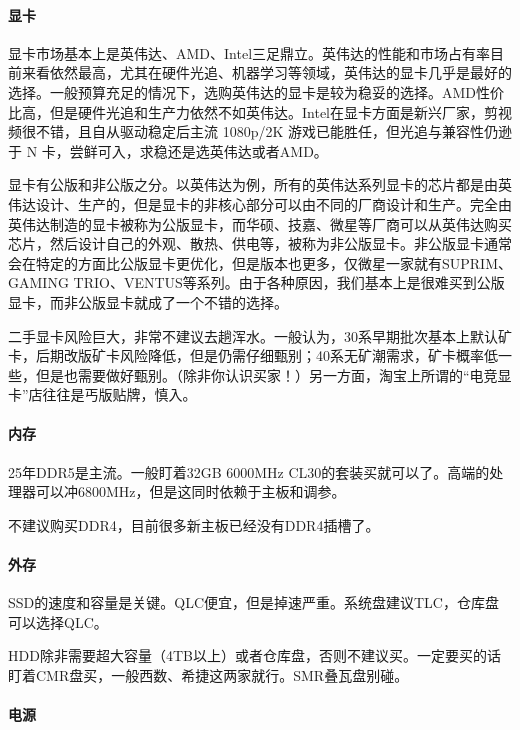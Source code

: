 \paragraph{显卡}

显卡市场基本上是英伟达、AMD、Intel三足鼎立。英伟达的性能和市场占有率目前来看依然最高，尤其在硬件光追、机器学习等领域，英伟达的显卡几乎是最好的选择。一般预算充足的情况下，选购英伟达的显卡是较为稳妥的选择。AMD性价比高，但是硬件光追和生产力依然不如英伟达。Intel在显卡方面是新兴厂家，剪视频很不错，且自从驱动稳定后主流 1080p/2K 游戏已能胜任，但光追与兼容性仍逊于 N 卡，尝鲜可入，求稳还是选英伟达或者AMD。

显卡有公版和非公版之分。以英伟达为例，所有的英伟达系列显卡的芯片都是由英伟达设计、生产的，但是显卡的非核心部分可以由不同的厂商设计和生产。完全由英伟达制造的显卡被称为公版显卡，而华硕、技嘉、微星等厂商可以从英伟达购买芯片，然后设计自己的外观、散热、供电等，被称为非公版显卡。非公版显卡通常会在特定的方面比公版显卡更优化，但是版本也更多，仅微星一家就有SUPRIM、GAMING TRIO、VENTUS等系列。由于各种原因，我们基本上是很难买到公版显卡，而非公版显卡就成了一个不错的选择。

二手显卡风险巨大，非常不建议去趟浑水。一般认为，30系早期批次基本上默认矿卡，后期改版矿卡风险降低，但是仍需仔细甄别；40系无矿潮需求，矿卡概率低一些，但是也需要做好甄别。（除非你认识买家！）另一方面，淘宝上所谓的“电竞显卡”店往往是丐版贴牌，慎入。

\paragraph{内存}

25年DDR5是主流。一般盯着32GB 6000MHz CL30的套装买就可以了。高端的处理器可以冲6800MHz，但是这同时依赖于主板和调参。

不建议购买DDR4，目前很多新主板已经没有DDR4插槽了。

\paragraph{外存}

SSD的速度和容量是关键。QLC便宜，但是掉速严重。系统盘建议TLC，仓库盘可以选择QLC。

HDD除非需要超大容量（4TB以上）或者仓库盘，否则不建议买。一定要买的话盯着CMR盘买，一般西数、希捷这两家就行。SMR叠瓦盘别碰。

\paragraph{电源}

